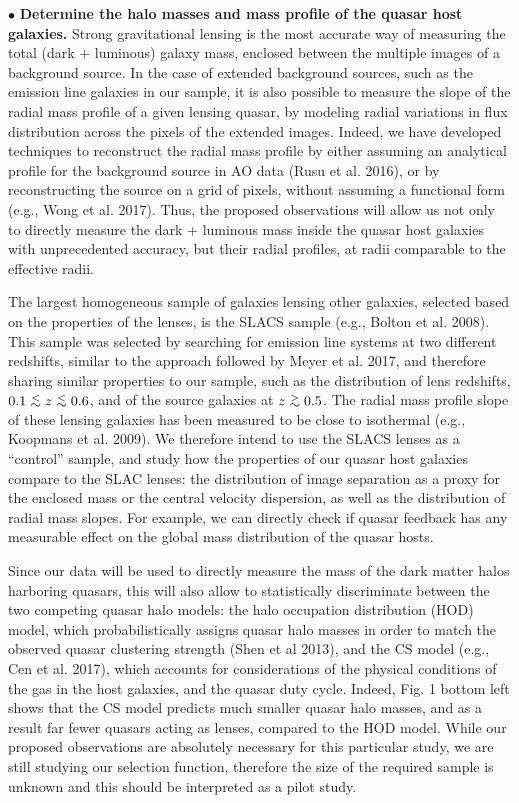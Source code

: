 \documentclass[a4paper,11pt]{article}
\newcommand{\gtrsim}{\lower.5ex\hbox{$\; \buildrel > \over \sim \;$}}
\newcommand{\lesssim}{\lower.5ex\hbox{$\; \buildrel < \over \sim \;$}}
\begin{document}
$\bullet$ {\bf Determine the halo masses and mass profile of the quasar host galaxies.} Strong gravitational lensing is the most accurate way of measuring the total (dark + luminous) galaxy mass, enclosed between the multiple images of a background source. In the case of extended background sources, such as the emission line galaxies in our sample, it is also possible to measure the slope of the radial mass profile of a given lensing quasar, by modeling radial variations in flux distribution across the pixels of the extended images. Indeed, we have developed techniques to reconstruct the radial mass profile by either assuming an analytical profile for the background source in AO data (Rusu et al. 2016), or by reconstructing the source on a grid of pixels, without assuming a functional form (e.g., Wong et al. 2017). Thus, the proposed observations will allow us not only to directly measure the dark + luminous mass inside the quasar host galaxies with unprecedented accuracy, but their radial profiles, at radii comparable to the effective radii. 

The largest homogeneous sample of galaxies lensing other galaxies, selected based on the properties of the lenses, is the SLACS sample (e.g., Bolton et al. 2008). This sample was selected by searching for emission line systems at two different redshifts, similar to the approach followed by Meyer et al. 2017, and therefore sharing similar properties to our sample, such as the distribution of lens redshifts, $0.1\lesssim z \lesssim 0.6$, and of the source galaxies at $z\gtrsim0.5$. The radial mass profile slope of these lensing galaxies has been measured to be close to isothermal (e.g., Koopmans et al. 2009). We therefore intend to use the SLACS lenses as a ``control'' sample, and study how the properties of our quasar host galaxies compare to the SLAC lenses: the distribution of image separation as a proxy for the enclosed mass or the central velocity dispersion, as well as the distribution of radial mass slopes. For example, we can directly check if quasar feedback has any measurable effect on the global mass distribution of the quasar hosts. 

Since our data will be used to directly measure the mass of the dark matter halos harboring quasars, this will also allow to statistically discriminate between the two competing quasar halo models: the halo occupation distribution (HOD) model, which probabilistically assigns quasar halo masses in order to match the observed quasar clustering strength (Shen et al 2013), and the CS model (e.g., Cen et al. 2017), which accounts for considerations of the physical conditions of the gas in the host galaxies, and the quasar duty cycle. Indeed, Fig. 1 bottom left shows that the CS model predicts much smaller quasar halo masses, and as a result far fewer quasars acting as lenses, compared to the HOD model. While our proposed observations are absolutely necessary for this particular study, we are still studying our selection function, therefore the size of the required sample is unknown and this should be interpreted as a pilot study.
\end{document}
